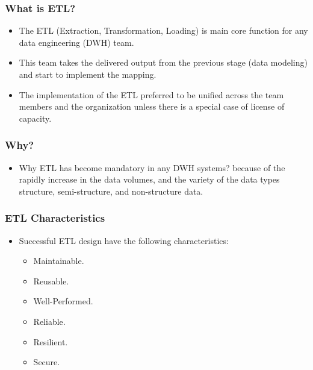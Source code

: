 \begin{frame}
	\frametitle{What is ETL?}
	
	\begin{itemize}[<+->]
		\item The ETL (Extraction, Transformation, Loading) is main core function for any data engineering (DWH) team.
		
		\item This team takes the delivered output from the previous stage (data modeling) and start to implement the mapping.
		
		\item The implementation of the ETL preferred to be unified across the team members and the organization unless
		there is a special case of license of capacity.
		
	\end{itemize}
	
\end{frame}
\begin{frame}
    \frametitle{Why?}

    \begin{itemize}[<+->]
        \item Why ETL has become mandatory in any DWH systems? because of the rapidly increase in the data volumes,
        and the variety of the data types structure, semi-structure, and non-structure data.

    \end{itemize}

\end{frame}

\begin{frame}
    \frametitle{ETL Characteristics}
    \begin{itemize}[<+->]
        \item Successful ETL design have the following characteristics:
        \begin{itemize}[<+->]
            \item [\faCheckSquareO] Maintainable.
            \item [\faCheckSquareO] Reusable.
            \item [\faCheckSquareO] Well-Performed.
            \item [\faCheckSquareO] Reliable.
            \item [\faCheckSquareO] Resilient.
            \item [\faCheckSquareO] Secure.
        \end{itemize}
    \end{itemize}
\end{frame}


